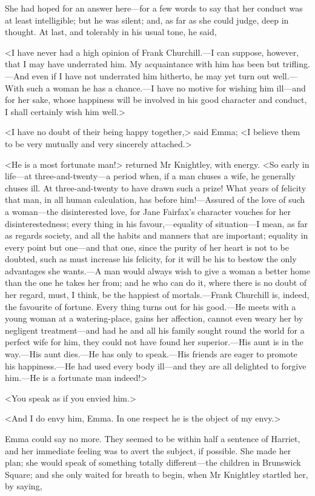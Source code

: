 She had hoped for an answer here—for a few words to say that her conduct was at least intelligible; but he was silent; and, as far as she could judge, deep in thought. At last, and tolerably in his usual tone, he said,

<I have never had a high opinion of Frank Churchill.—I can suppose, however, that I may have underrated him. My acquaintance with him has been but trifling.—And even if I have not underrated him hitherto, he may yet turn out well.—With such a woman he has a chance.—I have no motive for wishing him ill—and for her sake, whose happiness will be involved in his good character and conduct, I shall certainly wish him well.>

<I have no doubt of their being happy together,> said Emma; <I believe them to be very mutually and very sincerely attached.>

<He is a most fortunate man!> returned Mr Knightley, with energy. <So early in life—at three-and-twenty—a period when, if a man chuses a wife, he generally chuses ill. At three-and-twenty to have drawn such a prize! What years of felicity that man, in all human calculation, has before him!—Assured of the love of such a woman—the disinterested love, for Jane Fairfax's character vouches for her disinterestedness; every thing in his favour,—equality of situation—I mean, as far as regards society, and all the habits and manners that are important; equality in every point but one—and that one, since the purity of her heart is not to be doubted, such as must increase his felicity, for it will be his to bestow the only advantages she wants.—A man would always wish to give a woman a better home than the one he takes her from; and he who can do it, where there is no doubt of her regard, must, I think, be the happiest of mortals.—Frank Churchill is, indeed, the favourite of fortune. Every thing turns out for his good.—He meets with a young woman at a watering-place, gains her affection, cannot even weary her by negligent treatment—and had he and all his family sought round the world for a perfect wife for him, they could not have found her superior.—His aunt is in the way.—His aunt dies.—He has only to speak.—His friends are eager to promote his happiness.—He had used every body ill—and they are all delighted to forgive him.—He is a fortunate man indeed!>

<You speak as if you envied him.>

<And I do envy him, Emma. In one respect he is the object of my envy.>

Emma could say no more. They seemed to be within half a sentence of Harriet, and her immediate feeling was to avert the subject, if possible. She made her plan; she would speak of something totally different—the children in Brunswick Square; and she only waited for breath to begin, when Mr Knightley startled her, by saying,

